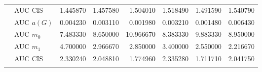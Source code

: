 \begin{table}[htbp]
\begin{tabular}{llrrrrrr}
    & AUC CIS & 1.445870 & 1.457580 & 1.504010 & 1.518490 & 1.491590 & 1.540790 \\
    \addlinespace
    \multirow{4}{*}{random} & AUC $a(G)$ & 0.004230 & 0.003110 & 0.001980 & 0.003210 & 0.001480 & 0.006430 \\
    & AUC $m_0$ & 7.483330 & 8.650000 & 10.966670 & 8.383330 & 9.883330 & 8.950000 \\
    & AUC $m_1$ & 4.700000 & 2.966670 & 2.850000 & 3.400000 & 2.550000 & 2.216670 \\
    & AUC CIS & 2.330240 & 2.048810 & 1.774960 & 2.335280 & 1.711710 & 2.041750 \\
    \addlinespace
    \bottomrule
  \end{tabular}
\end{table}

